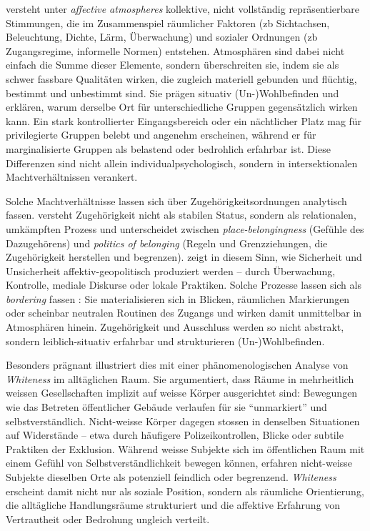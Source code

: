 \textcite{andersonAffectiveAtmospheres2009} versteht unter \emph{affective atmospheres} kollektive, nicht vollständig repräsentierbare Stimmungen, die im Zusammenspiel räumlicher Faktoren (\gls{zb} Sichtachsen, Beleuchtung, Dichte, Lärm, Überwachung) und sozialer Ordnungen (\gls{zb} Zugangsregime, informelle Normen) entstehen. Atmosphären sind dabei nicht einfach die Summe dieser Elemente, sondern überschreiten sie, indem sie als schwer fassbare Qualitäten wirken, die zugleich materiell gebunden und flüchtig, bestimmt und unbestimmt sind. Sie prägen situativ (Un\nobreakdash-)Wohlbefinden und erklären, warum derselbe Ort für unterschiedliche Gruppen gegensätzlich wirken kann. Ein stark kontrollierter Eingangsbereich oder ein nächtlicher Platz mag für privilegierte Gruppen belebt und angenehm erscheinen, während er für marginalisierte Gruppen als belastend oder bedrohlich erfahrbar ist. Diese Differenzen sind nicht allein individualpsychologisch, sondern in intersektionalen Machtverhältnissen verankert.

Solche Machtverhältnisse lassen sich über Zugehörigkeitsordnungen analytisch fassen. \textcite{antonsichSearchingBelongingAnalytical2010} versteht Zugehörigkeit nicht als stabilen Status, sondern als relationalen, umkämpften Prozess und unterscheidet zwischen \emph{place-belongingness} (Gefühle des Dazugehörens) und \emph{politics of belonging} (Regeln und Grenzziehungen, die Zugehörigkeit herstellen und begrenzen). \textcite{painGlobalizedFearEmotional2009} zeigt in diesem Sinn, wie Sicherheit und Unsicherheit affektiv-geopolitisch produziert werden -- durch Überwachung, Kontrolle, mediale Diskurse oder lokale Praktiken. Solche Prozesse lassen sich als \emph{bordering} fassen \parencite[\gls{vgl}][]{yuval-davisBelongingPoliticsBelonging2006}: Sie materialisieren sich in Blicken, räumlichen Markierungen oder scheinbar neutralen Routinen des Zugangs und wirken damit unmittelbar in Atmosphären hinein. Zugehörigkeit und Ausschluss werden so nicht abstrakt, sondern leiblich-situativ erfahrbar und strukturieren (Un\nobreakdash-)Wohlbefinden.

Besonders prägnant illustriert dies \textcite{ahmedPhenomenologyWhiteness2007} mit einer phänomenologischen Analyse von \emph{Whiteness} im alltäglichen Raum. Sie argumentiert, dass Räume in mehrheitlich weissen Gesellschaften implizit auf weisse Körper ausgerichtet sind: Bewegungen wie das Betreten öffentlicher Gebäude verlaufen für sie \enquote{unmarkiert} und selbstverständlich. Nicht-weisse Körper dagegen stossen in denselben Situationen auf Widerstände -- etwa durch häufigere Polizeikontrollen, Blicke oder subtile Praktiken der Exklusion. Während weisse Subjekte sich im öffentlichen Raum mit einem Gefühl von Selbstverständlichkeit bewegen können, erfahren nicht-weisse Subjekte dieselben Orte als potenziell feindlich oder begrenzend. \emph{Whiteness} erscheint damit nicht nur als soziale Position, sondern als räumliche Orientierung, die alltägliche Handlungsräume strukturiert und die affektive Erfahrung von Vertrautheit oder Bedrohung ungleich verteilt.

